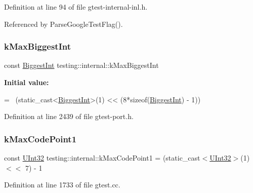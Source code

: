 Definition at line 94 of file gtest-\/internal-\/inl.\+h.



Referenced by Parse\+Google\+Test\+Flag().

\mbox{\label{namespacetesting_1_1internal_ad901880198832bc166d2493096b451f7}} 
\subsubsection{\texorpdfstring{k\+Max\+Biggest\+Int}{kMaxBiggestInt}}
{\footnotesize\ttfamily const \hyperlink{namespacetesting_1_1internal_a05c6bd9ede5ccdf25191a590d610dcc6}{Biggest\+Int} testing\+::internal\+::k\+Max\+Biggest\+Int}

{\bfseries Initial value\+:}
\begin{DoxyCode}
=
    ~(\textcolor{keyword}{static\_cast<}\hyperlink{namespacetesting_1_1internal_a05c6bd9ede5ccdf25191a590d610dcc6}{BiggestInt}\textcolor{keyword}{>}(1) << (8*\textcolor{keyword}{sizeof}(\hyperlink{namespacetesting_1_1internal_a05c6bd9ede5ccdf25191a590d610dcc6}{BiggestInt}) - 1))
\end{DoxyCode}


Definition at line 2439 of file gtest-\/port.\+h.

\mbox{\label{namespacetesting_1_1internal_a128515c8ed6c0fe98e498c8042da2060}} 
\subsubsection{\texorpdfstring{k\+Max\+Code\+Point1}{kMaxCodePoint1}}
{\footnotesize\ttfamily const \hyperlink{namespacetesting_1_1internal_a40d4fffcd2bf56f18b1c380615aa85e3}{U\+Int32} testing\+::internal\+::k\+Max\+Code\+Point1 = (static\+\_\+cast$<$\hyperlink{namespacetesting_1_1internal_a40d4fffcd2bf56f18b1c380615aa85e3}{U\+Int32}$>$(1) $<$$<$ 7) -\/ 1}



Definition at line 1733 of file gtest.\+cc.

\mbox{\label{namespacetesting_1_1internal_ab8f4a5ed784352f00342cfeadc72337e}} 
